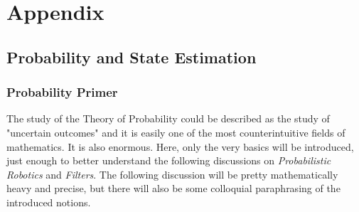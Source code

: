  \chapter{Appendix}
                \section{Probability and State Estimation}
                    \subsection{Probability Primer}
                        The study of the Theory of Probability could be described as the study of "uncertain outcomes" and it is easily one of the most counterintuitive fields of mathematics. It is also enormous. Here, only the very basics will be introduced, just enough to better understand the following discussions on \textit{Probabilistic Robotics} and \textit{Filters}. The following discussion will be pretty mathematically heavy and precise, but there will also be some colloquial paraphrasing of the introduced notions.
